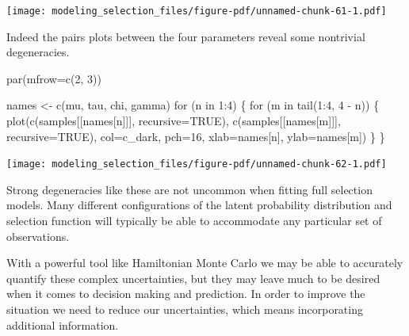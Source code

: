 \documentclass[
  letterpaper,
  DIV=11,
  numbers=noendperiod]{scrartcl}
\newenvironment{Shaded}{\begin{snugshade}}{\end{snugshade}}
\newcommand{\AttributeTok}[1]{\textcolor[rgb]{0.40,0.45,0.13}{#1}}
\newcommand{\ConstantTok}[1]{\textcolor[rgb]{0.56,0.35,0.01}{#1}}
\newcommand{\ControlFlowTok}[1]{\textcolor[rgb]{0.00,0.23,0.31}{#1}}
\newcommand{\DecValTok}[1]{\textcolor[rgb]{0.68,0.00,0.00}{#1}}
\newcommand{\FunctionTok}[1]{\textcolor[rgb]{0.28,0.35,0.67}{#1}}
\newcommand{\NormalTok}[1]{\textcolor[rgb]{0.00,0.23,0.31}{#1}}
\newcommand{\OtherTok}[1]{\textcolor[rgb]{0.00,0.23,0.31}{#1}}
\newcommand{\SpecialCharTok}[1]{\textcolor[rgb]{0.37,0.37,0.37}{#1}}
\newcommand{\StringTok}[1]{\textcolor[rgb]{0.13,0.47,0.30}{#1}}
\begin{document}
\texttt{[image: modeling\_selection\_files/figure-pdf/unnamed-chunk-61-1.pdf]}

Indeed the pairs plots between the four parameters reveal some
nontrivial degeneracies.

\begin{Shaded}
\begin{Highlighting}[]
\FunctionTok{par}\NormalTok{(}\AttributeTok{mfrow=}\FunctionTok{c}\NormalTok{(}\DecValTok{2}\NormalTok{, }\DecValTok{3}\NormalTok{))}

\NormalTok{names }\OtherTok{\textless{}{-}} \FunctionTok{c}\NormalTok{(}\StringTok{\textquotesingle{}mu\textquotesingle{}}\NormalTok{, }\StringTok{\textquotesingle{}tau\textquotesingle{}}\NormalTok{, }\StringTok{\textquotesingle{}chi\textquotesingle{}}\NormalTok{, }\StringTok{\textquotesingle{}gamma\textquotesingle{}}\NormalTok{)}
\ControlFlowTok{for}\NormalTok{ (n }\ControlFlowTok{in} \DecValTok{1}\SpecialCharTok{:}\DecValTok{4}\NormalTok{) \{}
  \ControlFlowTok{for}\NormalTok{ (m }\ControlFlowTok{in} \FunctionTok{tail}\NormalTok{(}\DecValTok{1}\SpecialCharTok{:}\DecValTok{4}\NormalTok{, }\DecValTok{4} \SpecialCharTok{{-}}\NormalTok{ n)) \{}
    \FunctionTok{plot}\NormalTok{(}\FunctionTok{c}\NormalTok{(samples[[names[n]]], }\AttributeTok{recursive=}\ConstantTok{TRUE}\NormalTok{),}
         \FunctionTok{c}\NormalTok{(samples[[names[m]]], }\AttributeTok{recursive=}\ConstantTok{TRUE}\NormalTok{),}
         \AttributeTok{col=}\NormalTok{c\_dark, }\AttributeTok{pch=}\DecValTok{16}\NormalTok{,}
         \AttributeTok{xlab=}\NormalTok{names[n], }\AttributeTok{ylab=}\NormalTok{names[m])}
\NormalTok{  \}}
\NormalTok{\}}
\end{Highlighting}
\end{Shaded}

\texttt{[image: modeling\_selection\_files/figure-pdf/unnamed-chunk-62-1.pdf]}

Strong degeneracies like these are not uncommon when fitting full
selection models. Many different configurations of the latent
probability distribution and selection function will typically be able
to accommodate any particular set of observations.

With a powerful tool like Hamiltonian Monte Carlo we may be able to
accurately quantify these complex uncertainties, but they may leave much
to be desired when it comes to decision making and prediction. In order
to improve the situation we need to reduce our uncertainties, which
means incorporating additional information.
\end{document}
